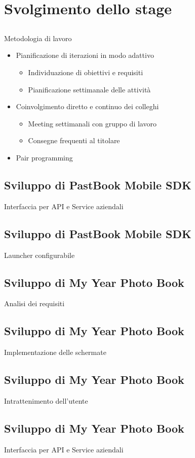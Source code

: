 \section{Svolgimento dello stage}
	\subsection{}
		\begin{frame}{Metodologia di lavoro}
			\begin{itemize}
				\item Pianificazione di iterazioni in modo adattivo
				\begin{itemize}
					\item Individuazione di obiettivi e requisiti
					\item Pianificazione settimanale delle attività
				\end{itemize}
				\item Coinvolgimento diretto e continuo dei colleghi
				\begin{itemize}
					\item Meeting settimanali con gruppo di lavoro
					\item Consegne frequenti al titolare
				\end{itemize}
				\item Pair programming
			\end{itemize}
		\end{frame}
	\subsection{Sviluppo di PastBook Mobile SDK}
		\begin{frame}{Interfaccia per API e Service aziendali}
		\end{frame}
	\subsection{Sviluppo di PastBook Mobile SDK}
		\begin{frame}{Launcher configurabile}
		\end{frame}
	\subsection{Sviluppo di My Year Photo Book}
		\begin{frame}{Analisi dei requisiti}
		\end{frame}
	\subsection{Sviluppo di My Year Photo Book}
		\begin{frame}{Implementazione delle schermate}
		\end{frame}
	\subsection{Sviluppo di My Year Photo Book}
		\begin{frame}{Intrattenimento dell'utente}
		\end{frame}
	\subsection{Sviluppo di My Year Photo Book}
		\begin{frame}{Interfaccia per API e Service aziendali}
		\end{frame}
